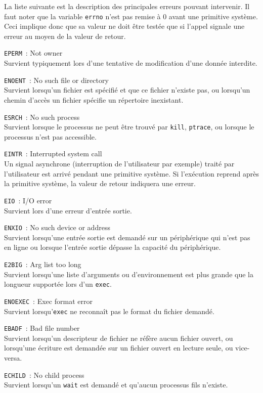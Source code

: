 \documentclass [twoside] {report}
\begin{document}
La liste suivante est la description
des principales erreurs pouvant intervenir. Il faut noter que
la variable \texttt {errno} n'est pas remise à 0 avant une
primitive système. Ceci implique donc que sa valeur ne
doit être testée que si l'appel signale une
erreur au moyen de la valeur de retour.

\texttt {EPERM}~: Not owner \\
Survient typiquement lors d'une
tentative de modification d'une donnée interdite.

\texttt {ENOENT}~: No such file or directory \\
Survient lorsqu'un fichier est spécifié et que ce
fichier n'existe pas, ou lorsqu'un chemin d'accès
un fichier spécifie un répertoire inexistant.

\texttt {ESRCH}~: No such process \\
Survient lorsque le processus ne peut être trouvé
par \texttt {kill}, \texttt {ptrace}, ou lorsque le processus
n'est pas accessible.

\texttt {EINTR}~: Interrupted system call \\
Un signal asynchrone (interruption de
l'utilisateur par exemple) traité par
l'utilisateur est arrivé pendant une primitive système.
Si l'exécution reprend après la primitive système, la
valeur de retour indiquera une erreur.

\texttt {EIO}~: I/O error \\
Survient lors d'une erreur d'entrée sortie.

\texttt {ENXIO}~: No such device or address \\
Survient lorsqu'une entrée sortie est demandé sur
un périphérique qui n'est pas en ligne ou lorsque
l'entrée sortie dépasse la capacité du
périphérique.

\texttt {E2BIG}~: Arg list too long \\
Survient lorsqu'une liste d'arguments ou
d'environnement est plus grande que la longueur
supportée lors d'un \texttt {exec}.

\texttt {ENOEXEC}~: Exec format error \\
Survient lorsqu'\texttt {exec} ne reconnaît pas le
format du fichier demandé.

\texttt {EBADF}~: Bad file number \\
Survient lorsqu'un descripteur de fichier ne
réfère aucun fichier ouvert, ou lorsqu'une
écriture est demandée sur un fichier ouvert en
lecture seule, ou vice-versa.

\texttt {ECHILD}~: No child process \\
Survient lorsqu'un \texttt {wait} est demandé et
qu'aucun processus fils n'existe.
\end{document}
